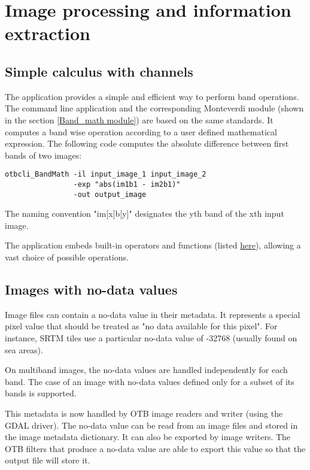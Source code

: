 \section{Image processing and information extraction}\label{sec:improc}

\subsection{Simple calculus with channels}\label{ssec:calculus}

The  application provides a simple and efficient
way to perform band operations. The command line application and the
corresponding Monteverdi module (shown in the section \ref{Band_math module})
are based on the same standards. It computes a band wise operation according
to a user defined mathematical expression. The following code computes the
absolute difference between first bands of two images:

\begin{verbatim}
otbcli_BandMath -il input_image_1 input_image_2
                -exp "abs(im1b1 - im2b1)"
                -out output_image
\end{verbatim}

The naming convention "im[x]b[y]" designates the yth band of the xth input image.

The  application embeds built-in operators and functions
(listed \href{http://muparser.sourceforge.net/mup_features.html#idDef2}{here}),
allowing a vast choice of possible operations.

\subsection{Images with no-data values}\label{ssec:nodata}

Image files can contain a no-data value in their metadata. It represents a
special pixel value that should be treated as "no data available for this pixel".
For instance, SRTM tiles use a particular no-data value of -32768 (usually
found on sea areas).

On multiband images, the no-data values are handled independently for each band.
The case of an image with no-data values defined only for a subset of its bands
is supported.

This metadata is now handled by OTB image readers and writer (using the GDAL
driver). The no-data value can be read from an image files and stored in the
image metadata dictionary. It can also be exported by image writers. The OTB
filters that produce a no-data value are able to export this value so that the
output file will store it.

